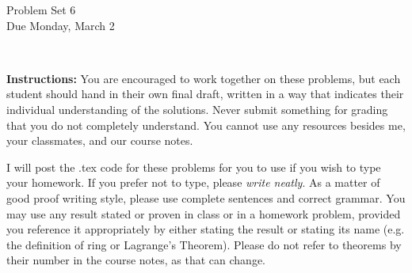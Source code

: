 \documentclass[11pt]{article}
\title{}
\date{\vspace{-0.5in}}
\theoremstyle{definition}
\begin{document}
\thispagestyle{fancy}
\pagestyle{fancy}

\vspace{3em}

\begin{center}
	{\LARGE Problem Set 6 \\}
	Due Monday, March 2
\end{center}

\

\noindent
{\bf Instructions:}
You are encouraged to work together on these problems, but each student should hand in their own final draft, written in a way that indicates their individual understanding of the solutions. Never submit something for grading that you do not completely understand. You cannot use any resources besides me, your classmates, and our course notes.


I will post the .tex code for these problems for you to use if you wish to type your homework. If you prefer not to type, please  {\em write neatly}. As a matter of good proof writing style, please use complete sentences and correct grammar. You may use any result stated or proven in class or in a homework problem, provided you reference it appropriately by either stating the result or stating its name (e.g. the definition of ring or Lagrange's Theorem). Please do not refer to theorems by their number in the course notes, as that can change.


\
\end{document}
